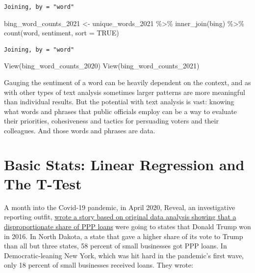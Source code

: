 \documentclass[
  letterpaper,
  DIV=11,
  numbers=noendperiod]{scrreprt}
\newenvironment{Shaded}{\begin{snugshade}}{\end{snugshade}}
\newcommand{\AttributeTok}[1]{\textcolor[rgb]{0.40,0.45,0.13}{#1}}
\newcommand{\ConstantTok}[1]{\textcolor[rgb]{0.56,0.35,0.01}{#1}}
\newcommand{\FunctionTok}[1]{\textcolor[rgb]{0.28,0.35,0.67}{#1}}
\newcommand{\NormalTok}[1]{\textcolor[rgb]{0.00,0.23,0.31}{#1}}
\newcommand{\OtherTok}[1]{\textcolor[rgb]{0.00,0.23,0.31}{#1}}
\newcommand{\SpecialCharTok}[1]{\textcolor[rgb]{0.37,0.37,0.37}{#1}}
\begin{document}
\begin{verbatim}
Joining, by = "word"
\end{verbatim}

\begin{Shaded}
\begin{Highlighting}[]
\NormalTok{bing\_word\_counts\_2021 }\OtherTok{\textless{}{-}}\NormalTok{ unique\_words\_2021 }\SpecialCharTok{\%\textgreater{}\%}
  \FunctionTok{inner\_join}\NormalTok{(bing) }\SpecialCharTok{\%\textgreater{}\%}
  \FunctionTok{count}\NormalTok{(word, sentiment, }\AttributeTok{sort =} \ConstantTok{TRUE}\NormalTok{)}
\end{Highlighting}
\end{Shaded}

\begin{verbatim}
Joining, by = "word"
\end{verbatim}

\begin{Shaded}
\begin{Highlighting}[]
\FunctionTok{View}\NormalTok{(bing\_word\_counts\_2020)}
\FunctionTok{View}\NormalTok{(bing\_word\_counts\_2021)}
\end{Highlighting}
\end{Shaded}

Gauging the sentiment of a word can be heavily dependent on the context,
and as with other types of text analysis sometimes larger patterns are
more meaningful than individual results. But the potential with text
analysis is vast: knowing what words and phrases that public officials
employ can be a way to evaluate their priorities, cohesiveness and
tactics for persuading voters and their colleagues. And those words and
phrases are data.


\hypertarget{basic-stats-linear-regression-and-the-t-test}{%
\chapter{Basic Stats: Linear Regression and The
T-Test}\label{basic-stats-linear-regression-and-the-t-test}}

A month into the Covid-19 pandemic, in April 2020, Reveal, an
investigative reporting outfit,
\href{https://revealnews.org/article/bailout-money-bypasses-hard-hit-new-york-california-for-north-dakota-nebraska/}{wrote
a story based on original data analysis showing that a disproportionate
share of PPP loans} were going to states that Donald Trump won in 2016.
In North Dakota, a state that gave a higher share of its vote to Trump
than all but three states, 58 percent of small businesses got PPP loans.
In Democratic-leaning New York, which was hit hard in the pandemic's
first wave, only 18 percent of small businesses received loans. They
wrote:
\end{document}
